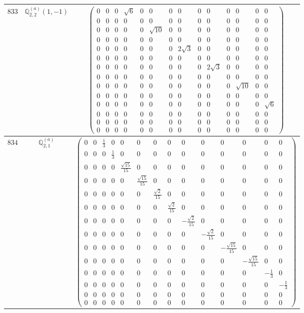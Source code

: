 \documentclass[fleqn,8pt,landscape]{jsarticle}
\begin{document}
\begin{center}
\begin{longtable}{ccc}
$ 833 $ & $ \mathbb{Q}_{2,2}^{(a)}(1,-1) $ & $ \begin{pmatrix} 0 & 0 & 0 & \sqrt{6} & 0 & 0 & 0 & 0 & 0 & 0 & 0 & 0 & 0 & 0 \\ 0 & 0 & 0 & 0 & 0 & 0 & 0 & 0 & 0 & 0 & 0 & 0 & 0 & 0 \\ 0 & 0 & 0 & 0 & 0 & \sqrt{10} & 0 & 0 & 0 & 0 & 0 & 0 & 0 & 0 \\ 0 & 0 & 0 & 0 & 0 & 0 & 0 & 0 & 0 & 0 & 0 & 0 & 0 & 0 \\ 0 & 0 & 0 & 0 & 0 & 0 & 0 & 2 \sqrt{3} & 0 & 0 & 0 & 0 & 0 & 0 \\ 0 & 0 & 0 & 0 & 0 & 0 & 0 & 0 & 0 & 0 & 0 & 0 & 0 & 0 \\ 0 & 0 & 0 & 0 & 0 & 0 & 0 & 0 & 0 & 2 \sqrt{3} & 0 & 0 & 0 & 0 \\ 0 & 0 & 0 & 0 & 0 & 0 & 0 & 0 & 0 & 0 & 0 & 0 & 0 & 0 \\ 0 & 0 & 0 & 0 & 0 & 0 & 0 & 0 & 0 & 0 & 0 & \sqrt{10} & 0 & 0 \\ 0 & 0 & 0 & 0 & 0 & 0 & 0 & 0 & 0 & 0 & 0 & 0 & 0 & 0 \\ 0 & 0 & 0 & 0 & 0 & 0 & 0 & 0 & 0 & 0 & 0 & 0 & 0 & \sqrt{6} \\ 0 & 0 & 0 & 0 & 0 & 0 & 0 & 0 & 0 & 0 & 0 & 0 & 0 & 0 \\ 0 & 0 & 0 & 0 & 0 & 0 & 0 & 0 & 0 & 0 & 0 & 0 & 0 & 0 \\ 0 & 0 & 0 & 0 & 0 & 0 & 0 & 0 & 0 & 0 & 0 & 0 & 0 & 0 \end{pmatrix} $ \\ \hline
$ 834 $ & $ \mathbb{Q}_{2,1}^{(a)} $ & $ \begin{pmatrix} 0 & 0 & \frac{1}{3} & 0 & 0 & 0 & 0 & 0 & 0 & 0 & 0 & 0 & 0 & 0 \\ 0 & 0 & 0 & \frac{1}{3} & 0 & 0 & 0 & 0 & 0 & 0 & 0 & 0 & 0 & 0 \\ 0 & 0 & 0 & 0 & \frac{\sqrt{15}}{15} & 0 & 0 & 0 & 0 & 0 & 0 & 0 & 0 & 0 \\ 0 & 0 & 0 & 0 & 0 & \frac{\sqrt{15}}{15} & 0 & 0 & 0 & 0 & 0 & 0 & 0 & 0 \\ 0 & 0 & 0 & 0 & 0 & 0 & \frac{\sqrt{2}}{15} & 0 & 0 & 0 & 0 & 0 & 0 & 0 \\ 0 & 0 & 0 & 0 & 0 & 0 & 0 & \frac{\sqrt{2}}{15} & 0 & 0 & 0 & 0 & 0 & 0 \\ 0 & 0 & 0 & 0 & 0 & 0 & 0 & 0 & - \frac{\sqrt{2}}{15} & 0 & 0 & 0 & 0 & 0 \\ 0 & 0 & 0 & 0 & 0 & 0 & 0 & 0 & 0 & - \frac{\sqrt{2}}{15} & 0 & 0 & 0 & 0 \\ 0 & 0 & 0 & 0 & 0 & 0 & 0 & 0 & 0 & 0 & - \frac{\sqrt{15}}{15} & 0 & 0 & 0 \\ 0 & 0 & 0 & 0 & 0 & 0 & 0 & 0 & 0 & 0 & 0 & - \frac{\sqrt{15}}{15} & 0 & 0 \\ 0 & 0 & 0 & 0 & 0 & 0 & 0 & 0 & 0 & 0 & 0 & 0 & - \frac{1}{3} & 0 \\ 0 & 0 & 0 & 0 & 0 & 0 & 0 & 0 & 0 & 0 & 0 & 0 & 0 & - \frac{1}{3} \\ 0 & 0 & 0 & 0 & 0 & 0 & 0 & 0 & 0 & 0 & 0 & 0 & 0 & 0 \\ 0 & 0 & 0 & 0 & 0 & 0 & 0 & 0 & 0 & 0 & 0 & 0 & 0 & 0 \end{pmatrix} $ \\ \hline

\end{longtable}
\end{center}
\end{document}
